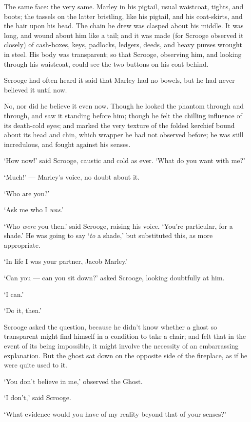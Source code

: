 \documentclass[11pt,twoside]{article}\makeatletter
\begin{document}
The same face: the very same. Marley in his pigtail, usual waistcoat, tights, and boots; the tassels on the latter bristling, like his pigtail, and his coat-skirts, and the hair upon his head. The chain he drew was clasped about his middle. It was long, and wound about him like a tail; and it was made (for Scrooge observed it closely) of cash-boxes, keys, padlocks, ledgers, deeds, and heavy purses wrought in steel. His body was transparent; so that Scrooge, observing him, and looking through his waistcoat, could see the two buttons on his coat behind. \par
Scrooge had often heard it said that Marley had no bowels, but he had never believed it until now. \par
No, nor did he believe it even now. Though he looked the phantom through and through, and saw it standing before him; though he felt the chilling influence of its death-cold eyes; and marked the very texture of the folded kerchief bound about its head and chin, which wrapper he had not observed before; he was still incredulous, and fought against his senses. \par
‘How now!’ said Scrooge, caustic and cold as ever. ‘What do you want with me?’\par
‘Much!’ — Marley's voice, no doubt about it.\par
‘Who are you?’\par
‘Ask me who I \textit{was}.’\par
‘Who \textit{were} you then.’ said Scrooge, raising his voice. ‘You're particular, for a shade.’ He was going to say ‘\textit{to} a shade,’ but substituted this, as more appropriate.\par
‘In life I was your partner, Jacob Marley.’\par
‘Can you — can you sit down?’ asked Scrooge, looking doubtfully at him. \par
‘I can.’\par
‘Do it, then.’\par
Scrooge asked the question, because he didn't know whether a ghost so transparent might find himself in a condition to take a chair; and felt that in the event of its being impossible, it might involve the necessity of an embarrassing explanation. But the ghost sat down on the opposite side of the fireplace, as if he were quite used to it. \par
‘You don't believe in me,’ observed the Ghost.\par
‘I don't,’ said Scrooge.\par
‘What evidence would you have of my reality beyond that of your senses?’\par
\end{document}
